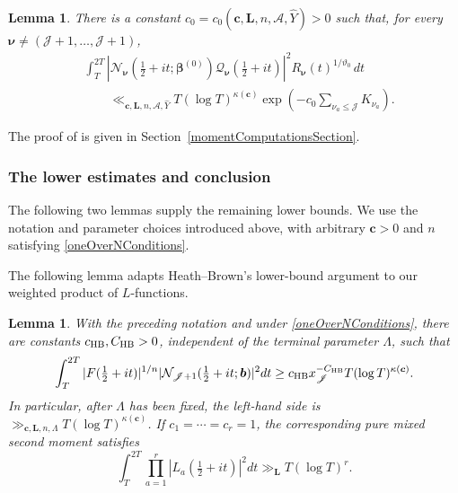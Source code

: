 \documentclass[oneside, 12pt]{amsart}
\newtheorem{lem}[thm]{Lemma}
\theoremstyle{definition}
\begin{document}
{		\begin{lem}\label{oneOverNResidualMeanLemma}
			There is a constant
			$c_0=c_0(\boldsymbol c,\boldsymbol L,n,\mathscr A, \widehat{Y})>0$ such that, for
			every $\boldsymbol\nu\neq
			(\mathscr J+1,\ldots,\mathscr J+1)$,
			\begin{align}
				&\int_T^{2T}
				|\mathcal N_{\boldsymbol\nu}(\tfrac12+it;
				\boldsymbol\beta^{(0)})
				\mathcal Q_{\boldsymbol\nu}(\tfrac12+it)|^2
				R_{\boldsymbol\nu}(t)^{1/\vartheta_0}\,dt\nonumber\\
				&\qquad\ll_{\boldsymbol c,\boldsymbol L,n,\mathscr A, \widehat{Y}}
				T(\log T)^{\kappa(\boldsymbol c)}
				\exp\left(-c_0
				\sum_{\nu_a\leq\mathscr J}K_{\nu_a}\right).
				\label{oneOverNResidualMeanEstimate}
			\end{align}
		\end{lem}
		
		The proof of 
		is given in Section~\ref{momentComputationsSection}.
		
		\subsubsection*{The lower estimates and conclusion}
		
		The following two lemmas supply the remaining lower bounds.
		We use the notation and parameter choices introduced above, with
		arbitrary $\boldsymbol c>0$ and $n$ satisfying
		\eqref{oneOverNConditions}.
		
		The following lemma adapts Heath--Brown's lower-bound argument
		\cite{Heath-Brown1} to our weighted product of $L$-functions.
		
		\begin{lem}\label{fullIntervalHeathBrownLemma}
			With the preceding notation and under \eqref{oneOverNConditions},
			there are constants $c_{\rm HB},C_{\rm HB}>0$, independent of the
			terminal parameter $\Lambda$, such that
			\begin{equation}\label{weightedHeathBrownComparison}
				\int_T^{2T}|F(\tfrac12+it)|^{1/n}
				|\mathcal N_{\mathscr J+1}(\tfrac12+it;\boldsymbol b)|^2dt
				\geq c_{\rm HB}x_{\mathscr J}^{-C_{\rm HB}}
				T(\log T)^{\kappa(\boldsymbol c)}.
			\end{equation}
			In particular, after $\Lambda$ has been fixed, the left-hand side is
			$\gg_{\boldsymbol c,\boldsymbol L,n,\Lambda}
			T(\log T)^{\kappa(\boldsymbol c)}$.
			If $c_1=\cdots=c_r=1$, the corresponding pure mixed second moment
			satisfies
			\begin{equation}\label{pureMixedSecondLowerBound}
				\int_T^{2T}\prod_{a=1}^r|L_a(\tfrac12+it)|^2dt
				\gg_{\boldsymbol L}T(\log T)^r.
			\end{equation}
		\end{lem}
		
}
\end{document}
